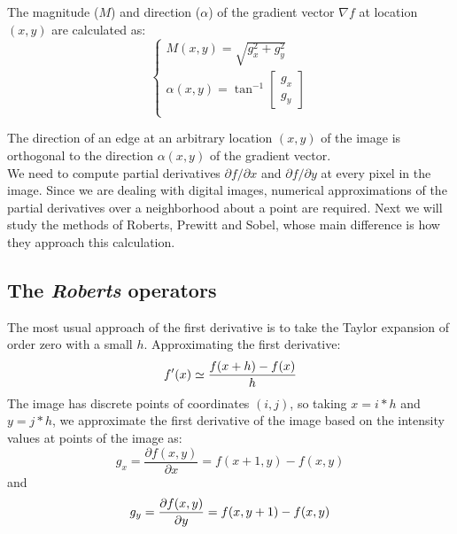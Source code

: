 \documentclass{ipol}
\numberwithin{equation}{section}
\numberwithin{table}{section}
\numberwithin{figure}{section}
\begin{document}
The magnitude ($M$) and direction ($\alpha$) of the gradient vector $\nabla f$ at location $(x,y)$
are calculated as:
\begin{equation}
	\begin{cases}
		M(x,y) = \sqrt{g_x^2 + g_y^2} \\
		\alpha(x,y) = \tan^{-1} \begin{bmatrix} g_x \\ g_y \end{bmatrix} \\
	\end{cases}
\end{equation}

The direction of an edge at an arbitrary location $(x,y)$ of the image is 
orthogonal to the direction $\alpha(x,y)$ of the gradient vector.\\

We need to compute partial derivatives $\partial f/\partial x$ and $\partial f/\partial y$ 
at every pixel in the image. Since we are dealing with digital images, numerical approximations 
of the partial derivatives over a neighborhood about a point are required. Next we will study 
the methods of Roberts, Prewitt and Sobel, whose main difference is how they approach this calculation.\\

\subsection{The \textit{Roberts} operators}

The most usual approach of the first derivative is to take the Taylor expansion of order zero with
a small $h$. Approximating the first derivative:
\begin{equation}
	f'(x) \simeq \frac{f(x+h) - f(x)}{h}\\
\end{equation}
The image has discrete points of coordinates $(i,j)$, so taking $x=i*h$ and $y=j*h$, we approximate the 
first derivative of the image based on the intensity values ​​at points of the image as:
\begin{equation}
\label{eq:roberts1}
	g_x = \frac{\partial f(x,y)}{\partial x} = f(x+1,y) - f(x,y)
\end{equation}
and
\begin{equation}
\label{eq:roberts2}
	g_y = \frac{\partial f(x,y)}{\partial y} = f(x,y+1) - f(x,y)\\
\end{equation}
\end{document}
